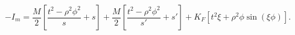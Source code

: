 \begin{equation}
\label{glupropaction}
-I_m=\frac{M}{2}[\frac{t^2-\rho^2\phi^2}{s}+s]+\frac{M}{2}[\frac{t^2-\rho^2\phi^2}{s'}+s']+K_F[t^2\xi +\rho^2\phi \sin (\xi \phi )].
\end{equation}

